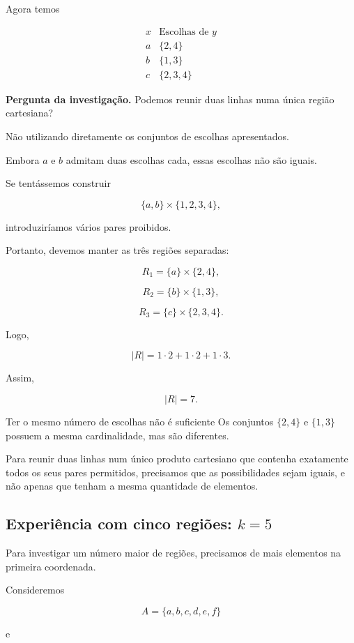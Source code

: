 \documentclass[11pt,a4paper,oneside]{book}
\newcommand{\Pergunta}[1]{\begin{perguntabox}\textbf{Pergunta da investigação.} #1\end{perguntabox}}
\newcommand{\card}[1]{\lvert #1\rvert}
\begin{document}
Agora temos

\[
\begin{array}{c|c}
x&\text{Escolhas de }y\\
\hline
a&\{2,4\}\\
b&\{1,3\}\\
c&\{2,3,4\}
\end{array}
\]

\Pergunta{Podemos reunir duas linhas
numa única região cartesiana?}

Não utilizando diretamente
os conjuntos de escolhas apresentados.

Embora $a$ e $b$ admitam
duas escolhas cada,
essas escolhas não são iguais.

Se tentássemos construir

\[
\{a,b\}\times\{1,2,3,4\},
\]

introduziríamos vários pares proibidos.

Portanto, devemos manter
as três regiões separadas:

\[
R_1=\{a\}\times\{2,4\},
\]

\[
R_2=\{b\}\times\{1,3\},
\]

\[
R_3=\{c\}\times\{2,3,4\}.
\]

Logo,

\[
\card R=1\cdot2+1\cdot2+1\cdot3.
\]

Assim,

\[
\boxed{\card R=7}.
\]

\begin{observacaobox}{Ter o mesmo número de escolhas não é suficiente}
Os conjuntos $\{2,4\}$ e $\{1,3\}$
possuem a mesma cardinalidade,
mas são diferentes.

Para reunir duas linhas num
único produto cartesiano que
contenha exatamente todos os
seus pares permitidos, precisamos
que as possibilidades sejam iguais,
e não apenas que tenham
a mesma quantidade de elementos.
\end{observacaobox}

\subsection*{Experiência com cinco regiões: $k=5$}

Para investigar um número maior
de regiões, precisamos de
mais elementos na primeira coordenada.

Consideremos

\[
A=\{a,b,c,d,e,f\}
\]

e
\end{document}
